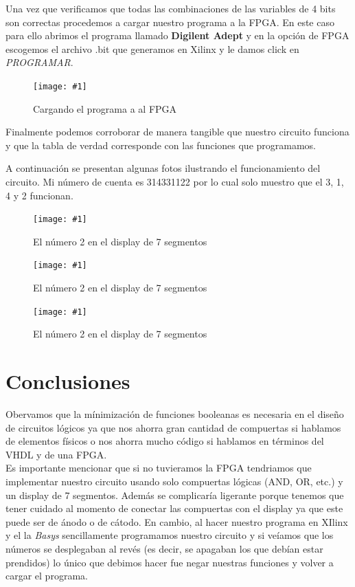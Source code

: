 \documentclass{mylib/reporteConCalif}
\newcommand{\insertImage}[3]{
	\begin{figure}[H]
		\centering
		\texttt{[image: \#1]}
		\caption{#2}
	\end{figure}
}
\begin{document}
Una vez que verificamos que todas las combinaciones de las variables de 4 bits son correctas procedemos a cargar nuestro programa a la FPGA. En este caso para ello abrimos el programa llamado \textbf{Digilent Adept} y en la opción de FPGA escogemos el archivo .bit que generamos en Xilinx y le damos click en \textit{PROGRAMAR}.

\insertImage{img/labdise_pract5/image3}{Cargando el programa a al FPGA}{10}

Finalmente podemos corroborar de manera tangible que nuestro circuito funciona y que la tabla de verdad corresponde con las funciones que programamos.

A continuación se presentan algunas fotos ilustrando el funcionamiento del circuito. Mi número de cuenta es 314331122 por lo cual solo muestro que el 3, 1, 4 y 2 funcionan.

\insertImage{img/labdise_pract5/dos}{El número 2 en el display de 7 segmentos}{12}

\insertImage{img/labdise_pract5/tres}{El número 2 en el display de 7 segmentos}{12}

\insertImage{img/labdise_pract5/cuatro}{El número 2 en el display de 7 segmentos}{12}


\section{Conclusiones}

Obervamos que la mínimización de funciones booleanas es necesaria en el diseño de circuitos lógicos ya que nos ahorra gran cantidad de compuertas si hablamos de elementos físicos o nos ahorra mucho código si hablamos en términos del VHDL y de una FPGA.\\

Es importante mencionar que si no tuvieramos la FPGA tendriamos que implementar nuestro circuito usando solo compuertas lógicas (AND, OR, etc.) y un display de 7 segmentos. Además se complicaría ligerante porque tenemos que tener cuidado al momento de conectar las compuertas con el display ya que este puede ser de ánodo o de cátodo. En cambio, al hacer nuestro programa en XIlinx y el la \textit{Basys} sencillamente programamos nuestro circuito y si veíamos que los números se desplegaban al revés (es decir, se apagaban los que debían estar prendidos) lo único que debimos hacer fue negar nuestras funciones y volver a cargar el programa.
\end{document}
